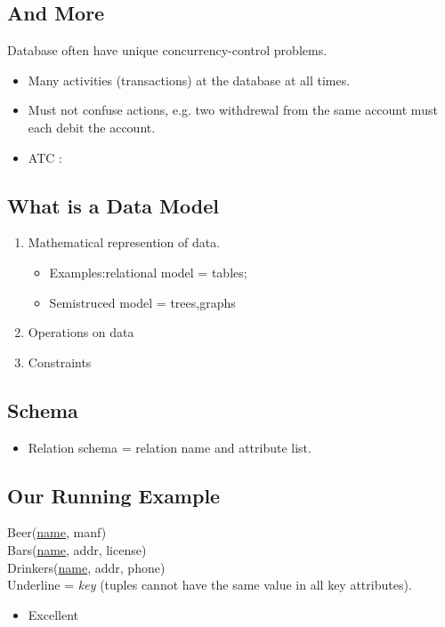 \documentclass[a4paper]{article}
\begin{document}
    \subsection{And More}
        Database often have unique 
        concurrency-control problems. \\
        \begin{itemize}
            \item Many activities (transactions) at the database at all times.
            \item Must not confuse actions, e.g. two withdrewal from the same account must each debit the account.
            \item ATC :
        \end{itemize}
    \subsection{What is a Data Model}
    \begin{enumerate}
        \item Mathematical represention of data.
        \begin{itemize}
            \item Examples:relational model = tables;
            \item Semistruced model = trees,graphs
        \end{itemize}
        \item Operations on data
        \item Constraints
    \end{enumerate}
    \subsection{Schema}
        \begin{itemize}
            \item Relation schema = relation name and attribute list.
        \end{itemize}

    \subsection{Our Running Example}
    Beer(\underline{name}, manf) \\
    Bars(\underline{name}, addr, license) \\
    Drinkers(\underline{name}, addr, phone) 
    \\
    Underline = \textit{key} (tuples cannot have the same value in all key attributes).
        \begin{itemize}
         \item Excellent 
         \end{itemize}
\end{document}
